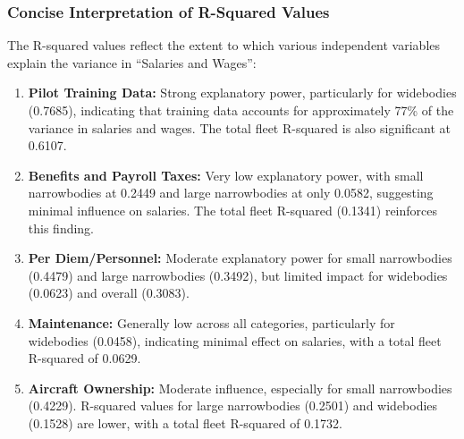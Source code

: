 \subsubsection{Concise Interpretation of R-Squared Values}

The R-squared values reflect the extent to which various independent variables explain the variance in ``Salaries and Wages'':

\begin{enumerate}
    \item \textbf{Pilot Training Data:}
          Strong explanatory power, particularly for widebodies (0.7685), indicating that training data accounts for approximately 77\% of the variance in salaries and wages. The total fleet R-squared is also significant at 0.6107.

    \item \textbf{Benefits and Payroll Taxes:}
          Very low explanatory power, with small narrowbodies at 0.2449 and large narrowbodies at only 0.0582, suggesting minimal influence on salaries. The total fleet R-squared (0.1341) reinforces this finding.

    \item \textbf{Per Diem/Personnel:}
          Moderate explanatory power for small narrowbodies (0.4479) and large narrowbodies (0.3492), but limited impact for widebodies (0.0623) and overall (0.3083).

    \item \textbf{Maintenance:}
          Generally low across all categories, particularly for widebodies (0.0458), indicating minimal effect on salaries, with a total fleet R-squared of 0.0629.

    \item \textbf{Aircraft Ownership:}
          Moderate influence, especially for small narrowbodies (0.4229). R-squared values for large narrowbodies (0.2501) and widebodies (0.1528) are lower, with a total fleet R-squared of 0.1732.
\end{enumerate}



